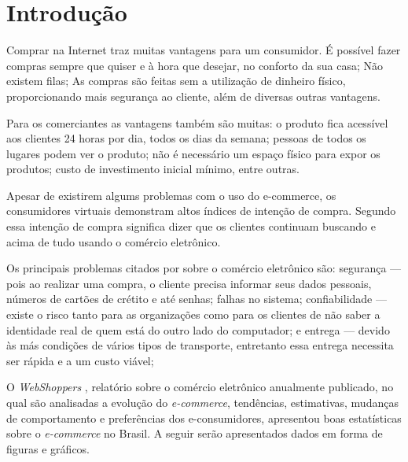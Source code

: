 \documentclass[a4paper,12pt]{monografia}
\renewcommand{\tablename}{Quadro}
\begin{document}
\renewcommand\listtablename{Lista de Quadros}

{%
\let\oldnumberline\numberline%
\renewcommand{\numberline}{\tablename~\oldnumberline}%
\listoftables%
\thispagestyle{empty}
}

\tableofcontents
\thispagestyle{empty}
% 
\chapter{Introdução} %
\label{cha:intro}

Comprar na Internet traz muitas vantagens para um consumidor. É possível fazer compras sempre que quiser e à hora que desejar, no conforto da sua casa; Não existem filas; As compras são feitas sem a utilização de dinheiro físico, proporcionando mais segurança ao cliente, além de diversas outras vantagens.

Para os comerciantes as vantagens também são muitas: o produto fica acessível aos clientes 24 horas por dia, todos os dias da semana; pessoas de todos os lugares podem ver o produto; não é necessário um espaço físico para expor os produtos; custo de investimento inicial mínimo, entre outras.

Apesar de existirem algums problemas com o uso do e-commerce, os consumidores virtuais demonstram altos índices de intenção de compra. Segundo  essa intenção de compra significa dizer que os clientes continuam buscando e acima de tudo usando o comércio eletrônico. 

Os principais problemas citados por  sobre o comércio eletrônico são: segurança --- pois ao realizar uma compra, o cliente precisa informar seus dados pessoais, números de cartões de crétito e até senhas; falhas no sistema; confiabilidade --- existe o risco tanto para as organizações como para os clientes de não saber a identidade real de quem está do outro lado do computador; e entrega --- devido às más condições de vários tipos de transporte, entretanto essa entrega necessita ser rápida e a um custo viável; 

O \textit{WebShoppers} , relatório sobre o comércio eletrônico anualmente publicado, no qual são analisadas a evolução do \textit{e-commerce}, tendências, estimativas, mudanças de comportamento e preferências dos e-consumidores, apresentou boas estatísticas sobre o \textit{e-commerce} no Brasil. A seguir serão apresentados dados em forma de figuras e gráficos.
\end{document}
